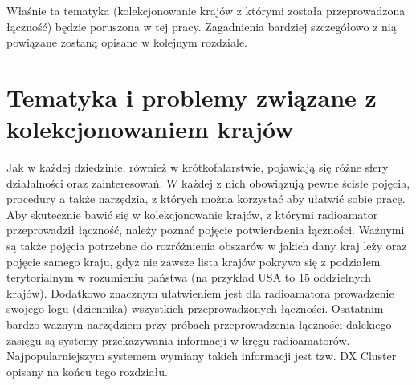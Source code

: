 \documentclass[]{mgr}
\begin{document}
                Właśnie ta tematyka (kolekcjonowanie krajów z którymi została przeprowadzona łączność) będzie poruszona w tej pracy. Zagadnienia bardziej szczegółowo z nią powiązane zostaną opisane w kolejnym rozdziale.

    \chapter{Tematyka i problemy związane z kolekcjonowaniem krajów}
    \label{sec:collecting_entities}

    Jak w każdej dziedzinie, również w krótkofalarstwie, pojawiają się różne sfery działalności oraz zainteresowań. W każdej z nich obowiązują pewne ścisłe pojęcia, procedury a także narzędzia, z których można korzystać aby ułatwić sobie pracę. Aby skutecznie bawić się w kolekcjonowanie krajów, z którymi radioamator przeprowadził łączność, należy poznać pojęcie potwierdzenia łączności. Ważnymi są także pojęcia potrzebne do rozróżnienia obszarów w jakich dany kraj leży oraz pojęcie samego kraju, gdyż nie zawsze lista krajów pokrywa się z podziałem terytorialnym w rozumieniu państwa (na przykład USA to 15 oddzielnych krajów). Dodatkowo znacznym ułatwieniem jest dla radioamatora prowadzenie swojego logu (dziennika) wszystkich przeprowadzonych łączności. Osatatnim bardzo ważnym narzędziem przy próbach przeprowadzenia łączności dalekiego zasięgu są systemy przekazywania informacji w kręgu radioamatorów. Najpopularniejszym systemem wymiany takich informacji jest tzw. DX Cluster opisany na końcu tego rozdziału.
\end{document}
